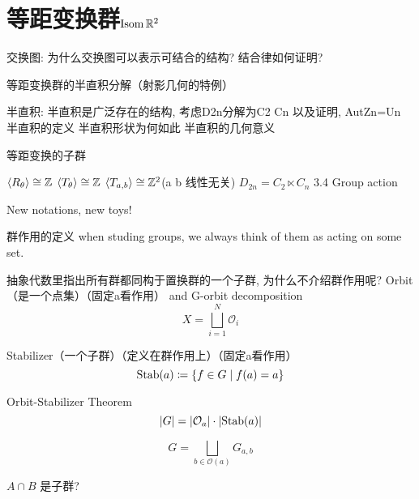 \chapter{等距变换群\(\operatorname{\mathrm{Isom}} \mathbb{R}^{2}\)}

交换图: 为什么交换图可以表示可结合的结构?
结合律如何证明?

等距变换群的半直积分解（射影几何的特例）

半直积:
半直积是广泛存在的结构, 考虑D2n分解为C2 Cn 以及证明, AutZn=Un
半直积的定义
半直积形状为何如此
半直积的几何意义

等距变换的子群

\(\langle R_{\theta} \rangle\cong \mathbb{Z}\)
\(\langle T_{\theta} \rangle\cong \mathbb{Z}\)
\(\langle T_{a,b} \rangle\cong \mathbb{Z}^{2}\)(a b 线性无关)
\(D_{2n}=C_{2}\ltimes C_{n}\)
3.4 Group action

New notations, new toys!

群作用的定义
when studing groups, we always think of them as acting on some set.

抽象代数里指出所有群都同构于置换群的一个子群, 为什么不介绍群作用呢?
Orbit（是一个点集）（固定a看作用） and G-orbit decomposition
\[
    X=\bigsqcup_{i=1}^{N} \mathcal{O}_{i}
\]

Stabilizer（一个子群）（定义在群作用上）（固定a看作用）
\[
    \operatorname{\mathrm{Stab}}(a)\coloneq \left\{ f \in G \mid f(a)=a \right\}
\]

Orbit-Stabilizer Theorem
\[
    \left| G \right| = \left| \mathcal{O}_{a} \right| \cdot
    \left| \operatorname{\mathrm{Stab}}(a) \right|
\]

\[
G= \bigsqcup_{b\in \mathcal{O}(a)} G_{a,b}
\]

\(A\cap B\) 是子群?
